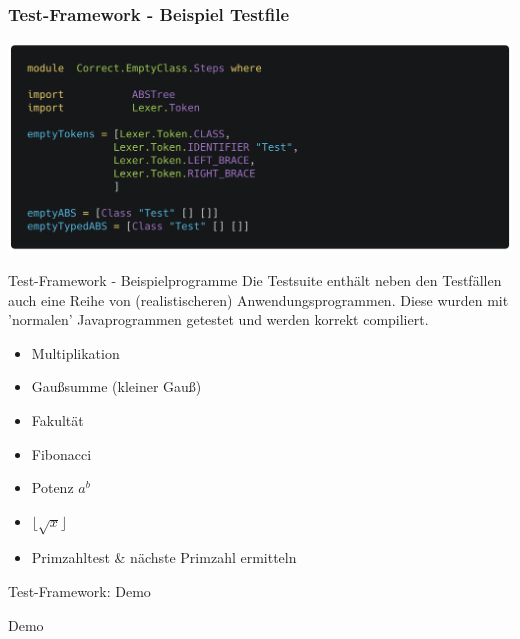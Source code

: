 \begin{frame}[fragile]
\frametitle{Test-Framework - Beispiel Testfile}
\begin{center}
	\includegraphics[width=1\textwidth]{images/test-framework/testfile}
\end{center}	
\end{frame}

\begin{frame}{Test-Framework - Beispielprogramme}
Die Testsuite enthält neben den Testfällen auch eine Reihe von (realistischeren) Anwendungsprogrammen. Diese wurden mit 'normalen' Javaprogrammen getestet und werden korrekt compiliert.
\pause

\begin{itemize}
	\item Multiplikation \pause 
	\item Gaußsumme (kleiner Gauß) \pause
	\item Fakultät \pause
	\item Fibonacci \pause
	\item Potenz $a^b$ \pause 
	\item $\lfloor \sqrt{x} \rfloor$ \pause
	\item Primzahltest \& nächste Primzahl ermitteln
\end{itemize}	
\end{frame}

\begin{frame}{Test-Framework: Demo}

	\begin{center}
		\huge{Demo}
	\end{center}
\end{frame}
